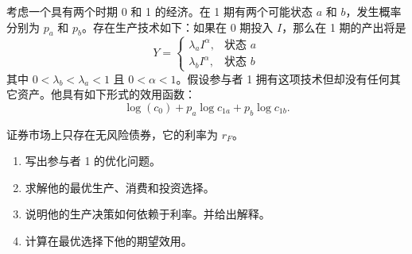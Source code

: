 
\par\noindent\begin{minipage}{\linewidth}
\begin{problem}
 考虑一个具有两个时期 0 和 1 的经济。在 1 期有两个可能状态 $a$ 和 $b$，发生概率分别为 $p_{a}$ 和 $p_{b}$。存在生产技术如下：如果在 0 期投入 $I$，那么在 1 期的产出将是
\[
    Y=\begin{cases}
        \lambda_{a}I^{\alpha},&\text{状态 }a\\
        \lambda_{b}I^{\alpha},&\text{状态 }b
    \end{cases}
\]
其中 $0<\lambda_{b}<\lambda_{a}<1$ 且 $0<\alpha<1$。假设参与者 1 拥有这项技术但却没有任何其它资产。他具有如下形式的效用函数：
\[
    \log(c_{0})+p_{a}\log c_{1a}+p_{b}\log c_{1b}.
\]

证券市场上只存在无风险债券，它的利率为 $r_{F}$。
\begin{enumerate}[label=(\alph*)]
    \item 写出参与者 1 的优化问题。
    \item 求解他的最优生产、消费和投资选择。
    \item 说明他的生产决策如何依赖于利率。并给出解释。
    \item 计算在最优选择下他的期望效用。
\end{enumerate}
\end{problem}
\end{minipage}\par
{}
